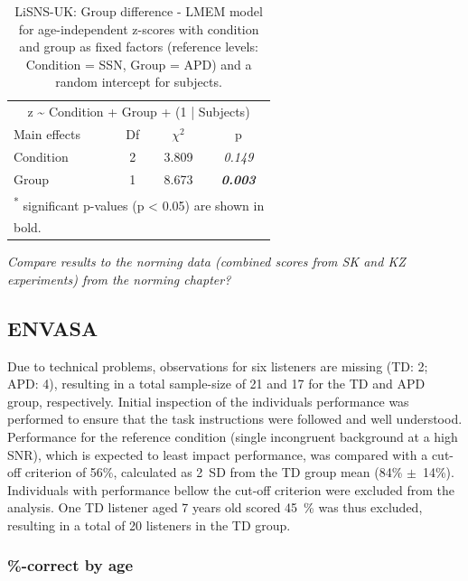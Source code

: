 \documentclass[a4paper, twoside]{templates/ociamthesis}
\begin{document}
\begin{table}

\caption{\label{tab:LiSNS-zLMEMTab}LiSNS-UK: Group difference - LMEM model for age-independent z-scores with condition and group as fixed factors (reference levels: Condition = SSN, Group = APD) and a random intercept for subjects.}
\centering
\begin{tabular}[t]{lcc>{}c}
\toprule
\multicolumn{4}{c}{z \textasciitilde{} Condition + Group + (1 | Subjects)} \\
\cmidrule(l{3pt}r{3pt}){1-4}
Main effects & Df & $\chi^{2}$ & p\\
\midrule
Condition & 2 & 3.809 & \em{0.149}\\
Group & 1 & 8.673 & \em{\textbf{0.003}}\\
\bottomrule
\multicolumn{4}{l}{\textsuperscript{*} significant p-values (p < 0.05) are shown in}\\
\multicolumn{4}{l}{bold.}\\
\end{tabular}
\end{table}

\begin{correction}
\emph{Compare results to the norming data (combined scores from SK and
KZ experiments) from the norming chapter?}
\end{correction}

\hypertarget{envasa}{%
\subsection{ENVASA}\label{envasa}}

Due to technical problems, observations for six listeners are missing (TD: 2; APD: 4), resulting in a total sample-size of 21 and 17 for the TD and APD group, respectively. Initial inspection of the individuals performance was performed to ensure that the task instructions were followed and well understood. Performance for the reference condition (single incongruent background at a high SNR), which is expected to least impact performance, was compared with a cut-off criterion of 56\%, calculated as 2~SD from the TD group mean (84\% \(\pm\)~14\%). Individuals with performance bellow the cut-off criterion were excluded from the analysis. One TD listener aged 7 years old scored 45~\% was thus excluded, resulting in a total of 20 listeners in the TD group.

\hypertarget{correct-by-age}{%
\subsubsection*{\%-correct by age}\label{correct-by-age}}
\end{document}
